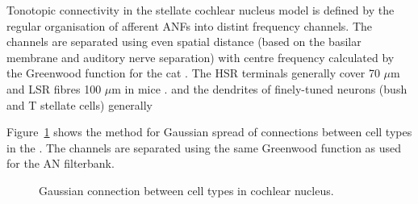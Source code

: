 Tonotopic connectivity in the stellate cochlear nucleus model is defined by the
regular organisation of afferent ANFs into distint frequency channels. The
channels are separated using even spatial distance (based on the basilar
membrane and auditory nerve separation) with centre frequency calculated by the
Greenwood function for the cat \citep{Greenwood:1990}. The HSR terminals
generally cover 70 $\mu$m and LSR fibres 100 $\mu$m in mice
\citep{OertelWuEtAl:1988,OertelWu:1989}.  and the dendrites of finely-tuned
neurons (bush and T stellate cells) generally

Figure~\ref{fig:CNconn} shows the method for Gaussian spread of connections
between cell types in the \CN.  The channels are separated using the same
Greenwood function as used for the AN filterbank.








\begin{figure}[htb]
  \begin{center}
    \caption{Gaussian connection between cell types in cochlear
      nucleus.}
    \label{fig:CNconn}
  \end{center}
\end{figure}

